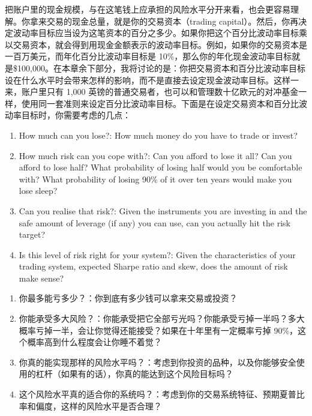 \begin{chineseblock}把账户里的现金规模，与在这笔钱上应承担的风险水平分开来看，也会更容易理解。你拿来交易的现金总量，就是你的交易资本（trading capital）。然后，你再决定波动率目标应当设为这笔资本的百分之多少。如果你把这个百分比波动率目标乘以交易资本，就会得到用现金金额表示的波动率目标。例如，如果你的交易资本是一百万美元，而年化百分比波动率目标是 10\%，那么你的年化现金波动率目标就是\$100,000。在本章余下部分，我将讨论的是：你把交易资本和百分比波动率目标设在什么水平时会带来怎样的影响，而不是直接去设定现金波动率目标。这样一来，账户里只有 1,000 英镑的普通交易者，也可以和管理数十亿欧元的对冲基金一样，使用同一套准则来设定百分比波动率目标。下面是在设定交易资本和百分比波动率目标时，你需要考虑的几点：\end{chineseblock}

\begin{enumerate}
\item How much can you lose?: How much money do you have to trade or invest?
\item How much risk can you cope with?: Can you afford to lose it all? Can you afford to lose half? What probability of losing half would you be comfortable with? What probability of losing 90\% of it over ten years would make you lose sleep?
\item Can you realise that risk?: Given the instruments you are investing in and the safe amount of leverage (if any) you can use, can you actually hit the risk target?
\item Is this level of risk right for your system?: Given the characteristics of your trading system, expected Sharpe ratio and skew, does the amount of risk make sense? \end{enumerate}

\begin{enumerate}
\item 你最多能亏多少？：你到底有多少钱可以拿来交易或投资？
\item 你能承受多大风险？：你能承受把它全部亏光吗？你能承受亏掉一半吗？多大概率亏掉一半，会让你觉得还能接受？如果在十年里有一定概率亏掉 90\%，这个概率高到什么程度会让你睡不着觉？
\item 你真的能实现那样的风险水平吗？：考虑到你投资的品种，以及你能够安全使用的杠杆（如果有的话），你真的能达到这个风险目标吗？
\item 这个风险水平真的适合你的系统吗？：考虑到你的交易系统特征、预期夏普比率和偏度，这样的风险水平是否合理？\end{enumerate}


